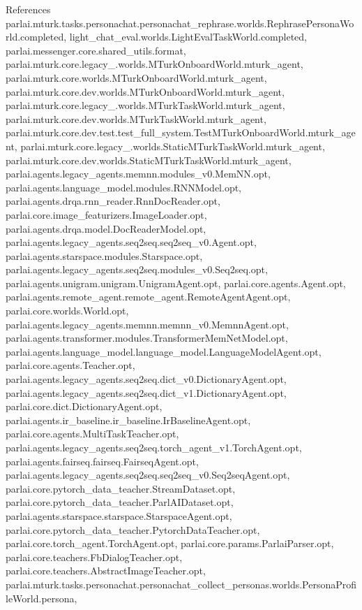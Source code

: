References parlai.\+mturk.\+tasks.\+personachat.\+personachat\+\_\+rephrase.\+worlds.\+Rephrase\+Persona\+World.\+completed, light\+\_\+chat\+\_\+eval.\+worlds.\+Light\+Eval\+Task\+World.\+completed, parlai.\+messenger.\+core.\+shared\+\_\+utils.\+format, parlai.\+mturk.\+core.\+legacy\+\_.\+worlds.\+M\+Turk\+Onboard\+World.\+mturk\+\_\+agent, parlai.\+mturk.\+core.\+worlds.\+M\+Turk\+Onboard\+World.\+mturk\+\_\+agent, parlai.\+mturk.\+core.\+dev.\+worlds.\+M\+Turk\+Onboard\+World.\+mturk\+\_\+agent, parlai.\+mturk.\+core.\+legacy\+\_.\+worlds.\+M\+Turk\+Task\+World.\+mturk\+\_\+agent, parlai.\+mturk.\+core.\+dev.\+worlds.\+M\+Turk\+Task\+World.\+mturk\+\_\+agent, parlai.\+mturk.\+core.\+dev.\+test.\+test\+\_\+full\+\_\+system.\+Test\+M\+Turk\+Onboard\+World.\+mturk\+\_\+agent, parlai.\+mturk.\+core.\+legacy\+\_.\+worlds.\+Static\+M\+Turk\+Task\+World.\+mturk\+\_\+agent, parlai.\+mturk.\+core.\+dev.\+worlds.\+Static\+M\+Turk\+Task\+World.\+mturk\+\_\+agent, parlai.\+agents.\+legacy\+\_\+agents.\+memnn.\+modules\+\_\+v0.\+Mem\+N\+N.\+opt, parlai.\+agents.\+language\+\_\+model.\+modules.\+R\+N\+N\+Model.\+opt, parlai.\+agents.\+drqa.\+rnn\+\_\+reader.\+Rnn\+Doc\+Reader.\+opt, parlai.\+core.\+image\+\_\+featurizers.\+Image\+Loader.\+opt, parlai.\+agents.\+drqa.\+model.\+Doc\+Reader\+Model.\+opt, parlai.\+agents.\+legacy\+\_\+agents.\+seq2seq.\+seq2seq\+\_\+v0.\+Agent.\+opt, parlai.\+agents.\+starspace.\+modules.\+Starspace.\+opt, parlai.\+agents.\+legacy\+\_\+agents.\+seq2seq.\+modules\+\_\+v0.\+Seq2seq.\+opt, parlai.\+agents.\+unigram.\+unigram.\+Unigram\+Agent.\+opt, parlai.\+core.\+agents.\+Agent.\+opt, parlai.\+agents.\+remote\+\_\+agent.\+remote\+\_\+agent.\+Remote\+Agent\+Agent.\+opt, parlai.\+core.\+worlds.\+World.\+opt, parlai.\+agents.\+legacy\+\_\+agents.\+memnn.\+memnn\+\_\+v0.\+Memnn\+Agent.\+opt, parlai.\+agents.\+transformer.\+modules.\+Transformer\+Mem\+Net\+Model.\+opt, parlai.\+agents.\+language\+\_\+model.\+language\+\_\+model.\+Language\+Model\+Agent.\+opt, parlai.\+core.\+agents.\+Teacher.\+opt, parlai.\+agents.\+legacy\+\_\+agents.\+seq2seq.\+dict\+\_\+v0.\+Dictionary\+Agent.\+opt, parlai.\+agents.\+legacy\+\_\+agents.\+seq2seq.\+dict\+\_\+v1.\+Dictionary\+Agent.\+opt, parlai.\+core.\+dict.\+Dictionary\+Agent.\+opt, parlai.\+agents.\+ir\+\_\+baseline.\+ir\+\_\+baseline.\+Ir\+Baseline\+Agent.\+opt, parlai.\+core.\+agents.\+Multi\+Task\+Teacher.\+opt, parlai.\+agents.\+legacy\+\_\+agents.\+seq2seq.\+torch\+\_\+agent\+\_\+v1.\+Torch\+Agent.\+opt, parlai.\+agents.\+fairseq.\+fairseq.\+Fairseq\+Agent.\+opt, parlai.\+agents.\+legacy\+\_\+agents.\+seq2seq.\+seq2seq\+\_\+v0.\+Seq2seq\+Agent.\+opt, parlai.\+core.\+pytorch\+\_\+data\+\_\+teacher.\+Stream\+Dataset.\+opt, parlai.\+core.\+pytorch\+\_\+data\+\_\+teacher.\+Parl\+A\+I\+Dataset.\+opt, parlai.\+agents.\+starspace.\+starspace.\+Starspace\+Agent.\+opt, parlai.\+core.\+pytorch\+\_\+data\+\_\+teacher.\+Pytorch\+Data\+Teacher.\+opt, parlai.\+core.\+torch\+\_\+agent.\+Torch\+Agent.\+opt, parlai.\+core.\+params.\+Parlai\+Parser.\+opt, parlai.\+core.\+teachers.\+Fb\+Dialog\+Teacher.\+opt, parlai.\+core.\+teachers.\+Abstract\+Image\+Teacher.\+opt, parlai.\+mturk.\+tasks.\+personachat.\+personachat\+\_\+collect\+\_\+personas.\+worlds.\+Persona\+Profile\+World.\+persona, 